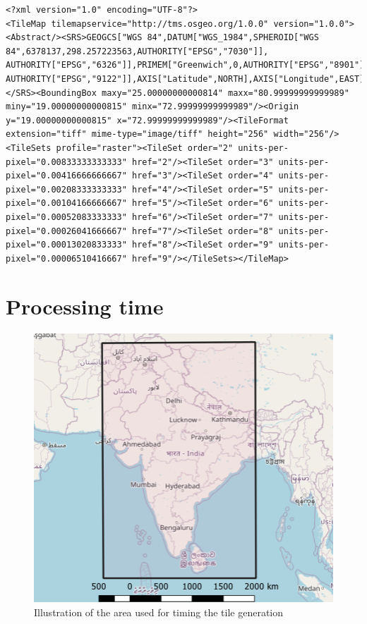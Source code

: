 \begin{lstlisting}[language=HTML5, caption={The metadata from the xml file generated by the modified gdal2tiles}, label= metaData,escapechar=|]
<?xml version="1.0" encoding="UTF-8"?>
<TileMap tilemapservice="http://tms.osgeo.org/1.0.0" version="1.0.0"><Abstract/><SRS>GEOGCS["WGS 84",DATUM["WGS_1984",SPHEROID["WGS 84",6378137,298.257223563,AUTHORITY["EPSG","7030"]],
AUTHORITY["EPSG","6326"]],PRIMEM["Greenwich",0,AUTHORITY["EPSG","8901"]],UNIT["degree",0.0174532925199433,
AUTHORITY["EPSG","9122"]],AXIS["Latitude",NORTH],AXIS["Longitude",EAST],AUTHORITY["EPSG","4326"]]
</SRS><BoundingBox maxy="25.00000000000814" maxx="80.99999999999989" miny="19.00000000000815" minx="72.99999999999989"/><Origin y="19.00000000000815" x="72.99999999999989"/><TileFormat extension="tiff" mime-type="image/tiff" height="256" width="256"/><TileSets profile="raster"><TileSet order="2" units-per-pixel="0.00833333333333" href="2"/><TileSet order="3" units-per-pixel="0.00416666666667" href="3"/><TileSet order="4" units-per-pixel="0.00208333333333" href="4"/><TileSet order="5" units-per-pixel="0.00104166666667" href="5"/><TileSet order="6" units-per-pixel="0.00052083333333" href="6"/><TileSet order="7" units-per-pixel="0.00026041666667" href="7"/><TileSet order="8" units-per-pixel="0.00013020833333" href="8"/><TileSet order="9" units-per-pixel="0.00006510416667" href="9"/></TileSets></TileMap>
\end{lstlisting}

\section{Processing time}\label{TilesTime}

\begin{figure} [H]
	\centering
	\includegraphics[width=.6\textwidth]{Pictures/ProcessingTime}
	\caption{Illustration of the area used for timing the tile generation}
	\label{ProcessingTime}
\end{figure}

